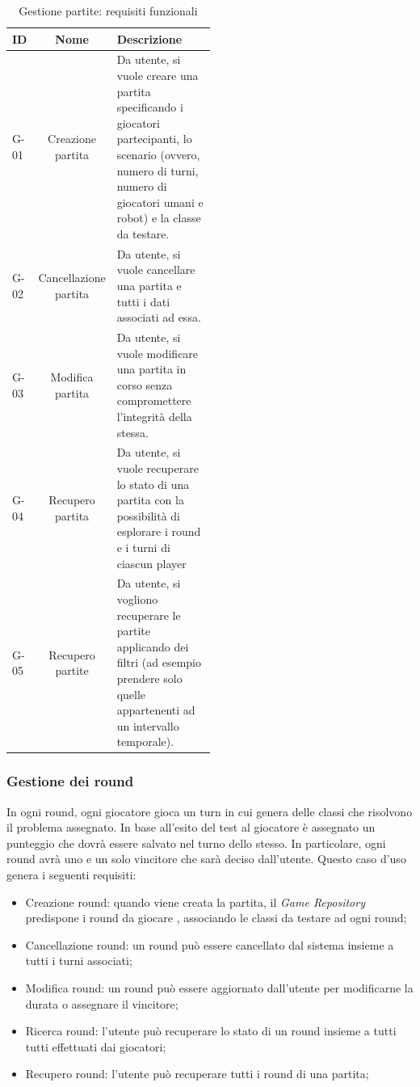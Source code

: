 \documentclass{article}
\begin{document}
\begin{table}[H]
  \center
  \begin{tabular}{|l|c|p{0.5\linewidth}|}
    \hline
    ID & Nome & Descrizione \\
    \hline
        G-01 & Creazione partita  & Da utente, si vuole creare una partita specificando i giocatori partecipanti, lo scenario (ovvero, numero di turni, numero di giocatori umani e robot) e la classe da testare. \\
        \hline
        G-02 & Cancellazione partita  & Da utente, si vuole cancellare una partita e tutti i dati associati ad essa. \\
        \hline
        G-03 & Modifica partita  & Da utente, si vuole modificare una partita in corso senza compromettere l'integrità della stessa. \\
        \hline
        G-04 & Recupero partita  & Da utente, si vuole recuperare lo stato di una partita con la possibilità di esplorare i round e i turni di ciascun \gls{player} \\
        \hline
        G-05 & Recupero partite  & Da utente, si vogliono recuperare le partite applicando dei filtri (ad esempio prendere solo quelle appartenenti ad un intervallo temporale). \\
    \hline
  \end{tabular}
  \caption{Gestione partite: requisiti funzionali}
  \label{tab:0x_functional_requirements}
\end{table}


\subsubsection{Gestione dei round}
In ogni \gls{round}, ogni giocatore gioca un \gls{turn} in cui genera delle classi che risolvono il problema assegnato. In base all'esito del test al giocatore è assegnato un punteggio che dovrà essere salvato nel turno dello stesso. In particolare, ogni round avrà uno e un solo vincitore che sarà deciso dall'utente. Questo caso d'uso genera i seguenti requisiti:

\begin{itemize}
    \item Creazione round: quando viene creata la partita, il \textit{Game Repository} predispone i
    round da giocare , associando le classi da testare ad ogni round;
    \item Cancellazione round: un round può essere cancellato dal sistema insieme a tutti i turni associati;
    \item Modifica round: un round può essere aggiornato dall'utente per modificarne la durata o assegnare il vincitore;
    \item Ricerca round: l'utente può recuperare lo stato di un round insieme a tutti tutti effettuati dai giocatori;
    \item Recupero round: l'utente può recuperare tutti i round di una partita;
\end{itemize}
\end{document}
